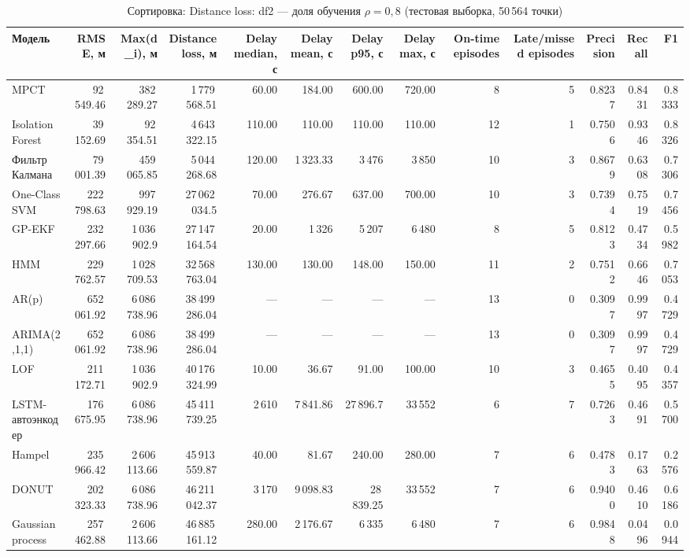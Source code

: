 \documentclass[a4paper,12pt]{report}
\begin{document}
\begin{table}[H]
\centering
\scriptsize
\setlength{\tabcolsep}{3pt}
\caption{Сортировка: Distance loss: df2 — доля обучения $\rho=0{,}8$ (тестовая выборка, 50\,564 точки)}
\begin{tabular}{lrrrrrrrrrrrr}
\toprule
Модель & RMSE, м & Max(d\_i), м & Distance loss, м & Delay median, с & Delay mean, с & Delay p95, с & Delay max, с & On-time episodes & Late/missed episodes & Precision & Recall & F1 \\
\midrule
MPCT & 92\,549.46 & 382\,289.27 & 1\,779\,568.51 & 60.00 & 184.00 & 600.00 & 720.00 & 8 & 5 & 0.8237 & 0.8431 & 0.8333 \\
Isolation Forest & 39\,152.69 & 92\,354.51 & 4\,643\,322.15 & 110.00 & 110.00 & 110.00 & 110.00 & 12 & 1 & 0.7506 & 0.9346 & 0.8326 \\
Фильтр Калмана & 79\,001.39 & 459\,065.85 & 5\,044\,268.68 & 120.00 & 1\,323.33 & 3\,476 & 3\,850 & 10 & 3 & 0.8679 & 0.6308 & 0.7306 \\
One-Class SVM & 222\,798.63 & 997\,929.19 & 27\,062\,034.5 & 70.00 & 276.67 & 637.00 & 700.00 & 10 & 3 & 0.7394 & 0.7519 & 0.7456 \\
GP-EKF & 232\,297.66 & 1\,036\,902.9 & 27\,147\,164.54 & 20.00 & 1\,326 & 5\,207 & 6\,480 & 8 & 5 & 0.8123 & 0.4734 & 0.5982 \\
HMM & 229\,762.57 & 1\,028\,709.53 & 32\,568\,763.04 & 130.00 & 130.00 & 148.00 & 150.00 & 11 & 2 & 0.7512 & 0.6646 & 0.7053 \\
AR(p) & 652\,061.92 & 6\,086\,738.96 & 38\,499\,286.04 & --- & --- & --- & --- & 13 & 0 & 0.3097 & 0.9997 & 0.4729 \\
ARIMA(2,1,1) & 652\,061.92 & 6\,086\,738.96 & 38\,499\,286.04 & --- & --- & --- & --- & 13 & 0 & 0.3097 & 0.9997 & 0.4729 \\
LOF & 211\,172.71 & 1\,036\,902.9 & 40\,176\,324.99 & 10.00 & 36.67 & 91.00 & 100.00 & 10 & 3 & 0.4655 & 0.4095 & 0.4357 \\
LSTM-автоэнкодер & 176\,675.95 & 6\,086\,738.96 & 45\,411\,739.25 & 2\,610 & 7\,841.86 & 27\,896.7 & 33\,552 & 6 & 7 & 0.7263 & 0.4691 & 0.5700 \\
Hampel & 235\,966.42 & 2\,606\,113.66 & 45\,913\,559.87 & 40.00 & 81.67 & 240.00 & 280.00 & 7 & 6 & 0.4783 & 0.1763 & 0.2576 \\
DONUT & 202\,323.33 & 6\,086\,738.96 & 46\,211\,042.37 & 3\,170 & 9\,098.83 & 28\,839.25 & 33\,552 & 7 & 6 & 0.9400 & 0.4610 & 0.6186 \\
Gaussian process & 257\,462.88 & 2\,606\,113.66 & 46\,885\,161.12 & 280.00 & 2\,176.67 & 6\,335 & 6\,480 & 7 & 6 & 0.9848 & 0.0496 & 0.0944 \\

\end{tabular}
\end{table}
\end{document}
